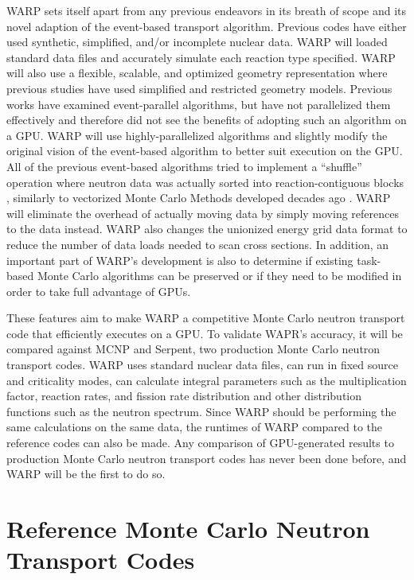 WARP sets itself apart from any previous endeavors in its breath of scope and its novel adaption of the event-based transport algorithm.  Previous codes have either used synthetic, simplified, and/or incomplete nuclear data.  WARP will loaded standard data files and accurately simulate each reaction type specified.  WARP will also use a flexible, scalable, and optimized geometry representation where previous studies have used simplified and restricted geometry models.  Previous works have examined event-parallel algorithms, but have not parallelized them effectively and therefore did not see the benefits of adopting such an algorithm on a GPU.  WARP will use highly-parallelized algorithms and slightly modify the original vision of the event-based algorithm to better suit execution on the GPU.  All of the previous event-based algorithms tried to implement a ``shuffle'' operation where neutron data was actually sorted into reaction-contiguous blocks \cite{nelson,tianyu_snamc}, similarly to vectorized Monte Carlo Methods developed decades ago \cite{vector,vujic_vector}.  WARP will eliminate the overhead of actually moving data by simply moving references to the data instead.  WARP also changes the unionized energy grid data format to reduce the number of data loads needed to scan cross sections.  In addition, an important part of WARP's development is also to determine if existing task-based Monte Carlo algorithms can be preserved or if they need to be modified in order to take full advantage of GPUs.

These features aim to make WARP a competitive Monte Carlo neutron transport code that efficiently executes on a GPU.  To validate WAPR's accuracy, it will be compared against MCNP and Serpent, two production Monte Carlo neutron transport codes.  WARP uses standard nuclear data files, can run in fixed source and criticality modes, can calculate integral parameters such as the multiplication factor, reaction rates, and fission rate distribution and other distribution functions such as the neutron spectrum.  Since WARP should be performing the same calculations on the same data, the runtimes of WARP compared to the reference codes can also be made.  Any comparison of GPU-generated results to production Monte Carlo neutron transport codes has never been done before, and WARP will be the first to do so.  


\section{Reference Monte Carlo Neutron Transport Codes}

